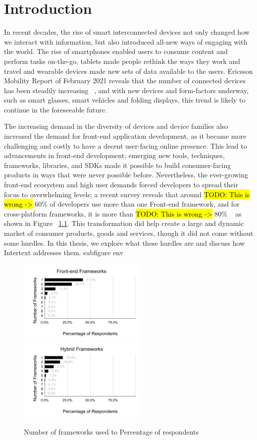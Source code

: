 
\chapter{Introduction} \label{introduction}

In recent decades, the rise of smart interconnected devices not only changed how we interact with information, but also introduced all-new ways of engaging with the world. The rise of smartphones enabled users to consume content and perform tasks on-the-go, tablets made people rethink the ways they work and travel and wearable devices made new sets of data available to the users. Ericsson Mobility Report of February 2021 reveals that the number of connected devices has been steadily increasing ~\cite{EricssonMobility2020}, and with new devices and form-factors underway, such as smart glasses, smart vehicles and folding displays, this trend is likely to continue in the foreseeable future. 

The increasing demand in the diversity of devices and device families also increased the demand for front-end application development, as it became more challenging and costly to have a decent user-facing online presence. This lead to advancements in front-end development; emerging new tools, techniques, frameworks, libraries, and SDKs made it possible to build consumer-facing products in ways that were never possible before. Nevertheless, the ever-growing front-end ecosystem and high user demands forced developers to spread their focus to overwhelming levels; a recent survey reveals that around \hl{TODO: This is wrong ->} 60\% of developers use more than one Front-end framework, and for cross-platform frameworks, it is more than \hl{TODO: This is wrong ->} 80\% ~\cite{StateOfJs2020} as shown in Figure ~\ref{fig:num_of_frameworks_used}. This transformation did help create a large and dynamic market of consumer products, goods and services, though it did not come without some hurdles. In this thesis, we explore what these hurdles are and discuss how Intertext addresses them.
subfigure env
\begin{figure}
  \centering
  \includegraphics[width=6.2cm]{images/sojs1.pdf}
  \,
  \includegraphics[width=6.2cm]{images/sojs2.pdf}
  \caption{Number of frameworks used to Percentage of respondents}%
  \label{fig:num_of_frameworks_used}%
\end{figure}

